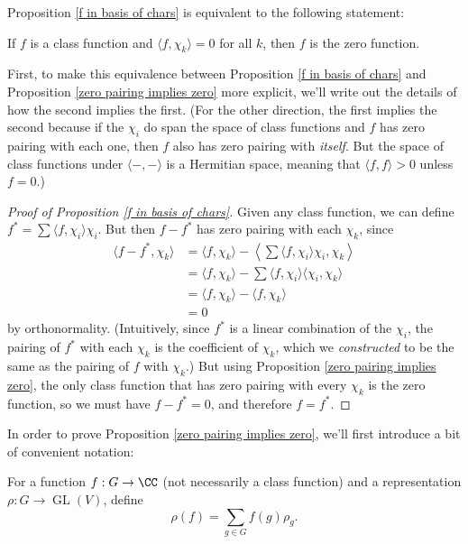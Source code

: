  Proposition \ref{f in basis of chars} is equivalent to the following statement:

\begin{proposition} \label{zero pairing implies zero}
If $f$ is a class function and $\langle f, \chi_k \rangle = 0$ for all $k$, then $f$ is the zero function. 
\end{proposition}

First, to make this equivalence between Proposition \ref{f in basis of chars} and Proposition \ref{zero pairing implies zero} more explicit, we'll write out the details of how the second implies the first. (For the other direction, the first implies the second because if the $\chi_i$ do span the space of class functions and $f$ has zero pairing with each one, then $f$ also has zero pairing with \emph{itself}. But the space of class functions under $\langle -, - \rangle$ is a Hermitian space, meaning that $\langle f, f \rangle > 0$ unless $f = 0$.)

\begin{proof}[Proof of Proposition \ref{f in basis of chars}] 
Given any class function, we can define $f^* = \sum \langle f, \chi_i \rangle \chi_i$. But then $f - f^*$ has zero pairing with each $\chi_k$, since 
\begin{align*}
    \langle f - f^*, \chi_k \rangle &= \langle f, \chi_k \rangle - \left\langle \sum \langle f, \chi_i \rangle \chi_i, \chi_k \right\rangle \\
    &= \langle f, \chi_k \rangle - \sum \langle f, \chi_i\rangle \langle \chi_i, \chi_k\rangle \\
    &= \langle f, \chi_k \rangle - \langle f, \chi_k \rangle \\
    &= 0
\end{align*}
by orthonormality. (Intuitively, since $f^*$ is a linear combination of the $\chi_i$, the pairing of $f^*$ with each $\chi_k$ is the coefficient of $\chi_k$, which we \emph{constructed} to be the same as the pairing of $f$ with $\chi_k$.) But using Proposition \ref{zero pairing implies zero}, the only class function that has zero pairing with every $\chi_k$ is the zero function, so we must have $f - f^* = 0$, and therefore $f = f^*$. 
\end{proof}

In order to prove Proposition \ref{zero pairing implies zero}, we'll first introduce a bit of convenient notation:

\begin{definition}
    For a function $f : G \to \CC$ (not necessarily a class function) and a representation $\rho : G \to \operatorname{GL}(V)$, define \[\rho(f) = \sum_{g \in G} f(g)\rho_g.\] 
\end{definition}

